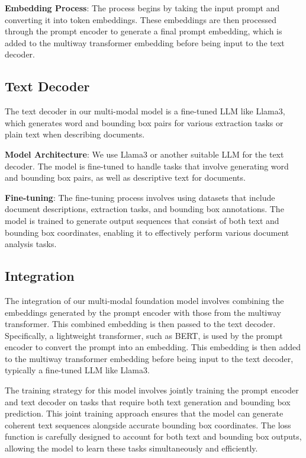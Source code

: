 \documentclass{article}
\begin{document}
\textbf{Embedding Process}:
The process begins by taking the input prompt and converting it into token embeddings. These embeddings are then processed through the prompt encoder to generate a final prompt embedding, which is added to the multiway transformer embedding before being input to the text decoder.

\subsection{Text Decoder}

The text decoder in our multi-modal model is a fine-tuned LLM like Llama3, which generates word and bounding box pairs for various extraction tasks or plain text when describing documents.

\textbf{Model Architecture}:
We use Llama3 or another suitable LLM for the text decoder. The model is fine-tuned to handle tasks that involve generating word and bounding box pairs, as well as descriptive text for documents.

\textbf{Fine-tuning}:
The fine-tuning process involves using datasets that include document descriptions, extraction tasks, and bounding box annotations. The model is trained to generate output sequences that consist of both text and bounding box coordinates, enabling it to effectively perform various document analysis tasks.

\subsection{Integration}

The integration of our multi-modal foundation model involves combining the embeddings generated by the prompt encoder with those from the multiway transformer. This combined embedding is then passed to the text decoder. Specifically, a lightweight transformer, such as BERT, is used by the prompt encoder to convert the prompt into an embedding. This embedding is then added to the multiway transformer embedding before being input to the text decoder, typically a fine-tuned LLM like Llama3.

The training strategy for this model involves jointly training the prompt encoder and text decoder on tasks that require both text generation and bounding box prediction. This joint training approach ensures that the model can generate coherent text sequences alongside accurate bounding box coordinates. The loss function is carefully designed to account for both text and bounding box outputs, allowing the model to learn these tasks simultaneously and efficiently.
\end{document}
